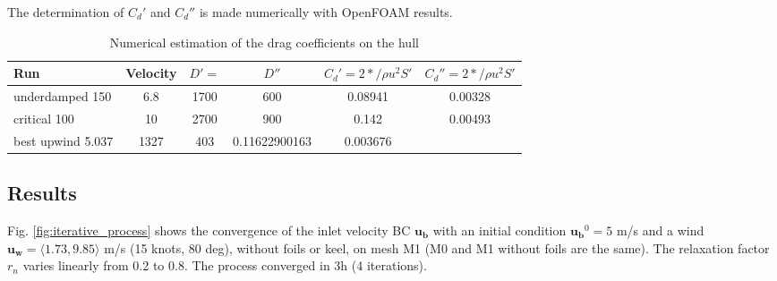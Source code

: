     The determination of $C_d'$ and $C_d''$ is made numerically with OpenFOAM results. 

    \begin{table}[ht!]
        \centering
        \begin{tabular}{p{4cm}|c|c|c|c|c}
            Run & Velocity & $D'=$ & $D''$ & $C_d'=2*/\rho u^2 S'$ & $C_d''=2*/\rho u^2 S'$ \\
            \hline  
            underdamped 150 & 6.8 & 1700 & 600 & 0.08941 & 0.00328 \\
            critical 100 & 10 & 2700 & 900 & 0.142 & 0.00493 \\
            best upwind 5.037 & 1327 & 403 & 0.11622900163 & 0.003676 \\  
        \end{tabular}
        \caption{Numerical estimation of the drag coefficients on the hull}
        \label{tab:dragCoeffHull}
    \end{table}


\clearpage
\subsection{Results}
    Fig. \ref{fig:iterative_process} shows the convergence of the inlet velocity BC $\mathbf{u_b}$ with an initial condition $\mathbf{u_b}^0 = 5$ m/s and a wind $\mathbf{u_w} = \langle 1.73, 9.85\rangle$ m/s (15 knots, 80 deg), without foils or keel, on mesh M1 (M0 and M1 without foils are the same). The relaxation factor $r_n$ varies linearly from 0.2 to 0.8. The process converged in 3h (4 iterations). 

